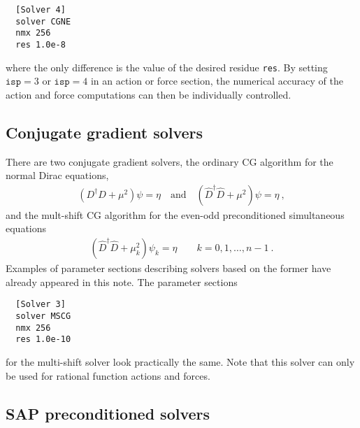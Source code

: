 \documentclass[11pt,fleqn]{article}
\begin{document}
\begin{verbatim}
  [Solver 4]
  solver CGNE
  nmx 256
  res 1.0e-8
\end{verbatim}
%
where the only difference is the value of the desired residue \texttt{res}. By
setting $\texttt{isp}=3$ or $\texttt{isp}=4$ in an action or force section, the
numerical accuracy of the action and force computations can then be individually
controlled.


\subsection{Conjugate gradient solvers}
\label{subsec:solvers:cg}

There are two conjugate gradient solvers, the ordinary CG algorithm for the
normal Dirac equations,
%
\begin{gather}
   (D^\dag D + \mu^2) \psi = \eta \quad \text{and} \quad (\hat{D}^\dag \hat{D} + \mu^2) \psi = \eta \ ,
\end{gather}
%
and the mult-shift CG algorithm for the even-odd preconditioned simultaneous
equations \cite{openQCD:mscg}
%
\begin{gather}
   (\hat{D}^\dag \hat{D} + \mu_k^2) \psi_k = \eta \qquad k=0,1,\dots,n-1 \ .
\end{gather}
%
Examples of parameter sections describing solvers based on the former have
already appeared in this note. The parameter sections
%
\begin{verbatim}
  [Solver 3]
  solver MSCG
  nmx 256
  res 1.0e-10
\end{verbatim}
%
for the multi-shift solver look practically the same. Note that this solver can
only be used for rational function actions and forces.



\subsection{SAP preconditioned solvers}
\label{subsec:solvers:sap}
\end{document}

